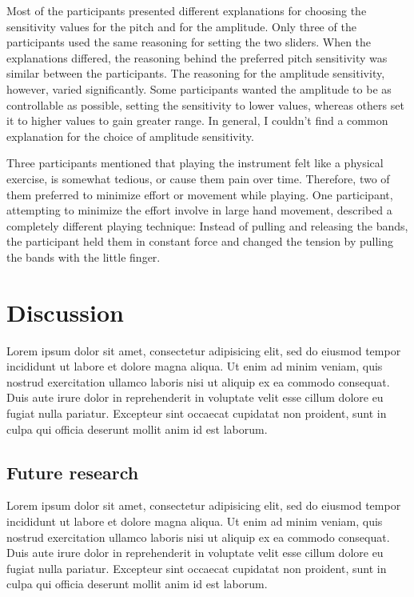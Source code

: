 \documentclass{sigchi}
\begin{document}
Most of the participants presented different explanations for choosing the sensitivity values for the pitch and for the amplitude.
Only three of the participants used the same reasoning for setting the two sliders.
When the explanations differed, the reasoning behind the preferred pitch sensitivity was similar between the participants.
The reasoning for the amplitude sensitivity, however, varied significantly.
Some participants wanted the amplitude to be as controllable as possible, setting the sensitivity to lower values, whereas others set it to higher values to gain greater range.
In general, I couldn't find a common explanation for the choice of amplitude sensitivity.

Three participants mentioned that playing the instrument felt like a physical exercise, is somewhat tedious, or cause them pain over time.
Therefore, two of them preferred to minimize effort or movement while playing.
One participant, attempting to minimize the effort involve in large hand movement, described a completely different playing technique:
Instead of pulling and releasing the bands, the participant held them in constant force and changed the tension by pulling the bands with the little finger.

\section{Discussion}

Lorem ipsum dolor sit amet, consectetur adipisicing elit, sed do eiusmod tempor incididunt ut labore et dolore magna aliqua. Ut enim ad minim veniam, quis nostrud exercitation ullamco laboris nisi ut aliquip ex ea commodo consequat. Duis aute irure dolor in reprehenderit in voluptate velit esse cillum dolore eu fugiat nulla pariatur. Excepteur sint occaecat cupidatat non proident, sunt in culpa qui officia deserunt mollit anim id est laborum.

\subsection{Future research}

Lorem ipsum dolor sit amet, consectetur adipisicing elit, sed do eiusmod tempor incididunt ut labore et dolore magna aliqua. Ut enim ad minim veniam, quis nostrud exercitation ullamco laboris nisi ut aliquip ex ea commodo consequat. Duis aute irure dolor in reprehenderit in voluptate velit esse cillum dolore eu fugiat nulla pariatur. Excepteur sint occaecat cupidatat non proident, sunt in culpa qui officia deserunt mollit anim id est laborum.

\balance{}



\end{document}
